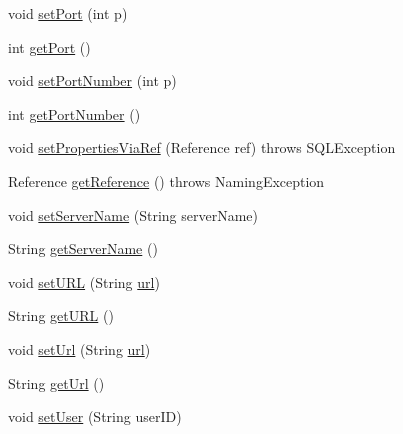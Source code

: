 \begin{DoxyCompactItemize}
\item 
void \mbox{\hyperlink{classcom_1_1mysql_1_1cj_1_1jdbc_1_1_mysql_data_source_a008a1d301424119b5820fa8e3acd1ce7}{set\+Port}} (int p)
\item 
int \mbox{\hyperlink{classcom_1_1mysql_1_1cj_1_1jdbc_1_1_mysql_data_source_a45dddaf76537f2f708c6790e348369fa}{get\+Port}} ()
\item 
void \mbox{\hyperlink{classcom_1_1mysql_1_1cj_1_1jdbc_1_1_mysql_data_source_ac67d0eda45968c9dd12c4ea7241cead1}{set\+Port\+Number}} (int p)
\item 
int \mbox{\hyperlink{classcom_1_1mysql_1_1cj_1_1jdbc_1_1_mysql_data_source_a59aae6b9598f9021a0c676f237ddf465}{get\+Port\+Number}} ()
\item 
void \mbox{\hyperlink{classcom_1_1mysql_1_1cj_1_1jdbc_1_1_mysql_data_source_a5b168678c34fa8a4d27c480e78a2cab7}{set\+Properties\+Via\+Ref}} (Reference ref)  throws S\+Q\+L\+Exception 
\item 
Reference \mbox{\hyperlink{classcom_1_1mysql_1_1cj_1_1jdbc_1_1_mysql_data_source_a6acbbcd3dfbb948cf5231d2bd0a58928}{get\+Reference}} ()  throws Naming\+Exception 
\item 
void \mbox{\hyperlink{classcom_1_1mysql_1_1cj_1_1jdbc_1_1_mysql_data_source_ab8d27cf5e8488999237c5ee21f56803e}{set\+Server\+Name}} (String server\+Name)
\item 
String \mbox{\hyperlink{classcom_1_1mysql_1_1cj_1_1jdbc_1_1_mysql_data_source_acca69f2259888471ef39586befb8ec61}{get\+Server\+Name}} ()
\item 
void \mbox{\hyperlink{classcom_1_1mysql_1_1cj_1_1jdbc_1_1_mysql_data_source_a03d52b5b48fb303375e5c1b35b7f52f9}{set\+U\+RL}} (String \mbox{\hyperlink{classcom_1_1mysql_1_1cj_1_1jdbc_1_1_mysql_data_source_a3e7b4dc2d4ae64f960ee5970a60112b3}{url}})
\item 
String \mbox{\hyperlink{classcom_1_1mysql_1_1cj_1_1jdbc_1_1_mysql_data_source_aa623564ec5fb8ced6d39d8cd441b70bb}{get\+U\+RL}} ()
\item 
void \mbox{\hyperlink{classcom_1_1mysql_1_1cj_1_1jdbc_1_1_mysql_data_source_adefc4cd844fa0cae59fcf49163692e4e}{set\+Url}} (String \mbox{\hyperlink{classcom_1_1mysql_1_1cj_1_1jdbc_1_1_mysql_data_source_a3e7b4dc2d4ae64f960ee5970a60112b3}{url}})
\item 
String \mbox{\hyperlink{classcom_1_1mysql_1_1cj_1_1jdbc_1_1_mysql_data_source_a5baa5243975b05f88cdb631c88a60185}{get\+Url}} ()
\item 
void \mbox{\hyperlink{classcom_1_1mysql_1_1cj_1_1jdbc_1_1_mysql_data_source_a34a8c203cf757fa8e40e88e5af2cff0b}{set\+User}} (String user\+ID)

\end{DoxyCompactItemize}
